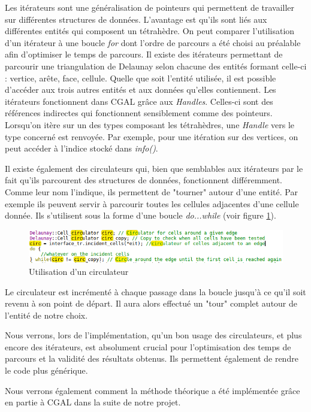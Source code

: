 Les itérateurs sont une généralisation de pointeurs qui permettent de travailler sur
différentes structures de données. L'avantage est qu'ils sont liés aux différentes entités
qui composent un tétrahèdre. On peut comparer l'utilisation d'un itérateur à une boucle
\textit{for} dont l'ordre de parcours a été choisi au préalable afin d'optimiser
le temps de parcours.
Il existe des itérateurs permettant de parcourir une triangulation de Delaunay
selon chacune des entités formant celle-ci : vertice, arête, face, cellule. Quelle
que soit l'entité utilisée, il est possible d'accéder aux trois autres entités et
aux données qu'elles contiennent. Les itérateurs fonctionnent dans CGAL grâce aux
\textit{Handles}. Celles-ci sont des références indirectes qui fonctionnent sensiblement
comme des pointeurs. Lorsqu'on itère sur un des types composant les tétrahèdres, une
\textit{Handle} vers le type concerné est renvoyée. Par exemple, pour une itération sur des
vertices, on peut accéder à l'indice stocké dans \textit{info()}.



Il existe également des circulateurs qui, bien que semblables aux itérateurs par le fait
qu'ils parcourent des structures de données, fonctionnent différemment. Comme leur nom
l'indique, ils permettent de "tourner" autour d'une entité. Par exemple ils peuvent
servir à parcourir toutes les cellules adjacentes d'une cellule donnée. Ils s'utilisent
sous la forme d'une boucle \textit{do...while} (voir figure \ref{fig::circ_ex}).
\begin{figure}[ht]
\centering
  \includegraphics[width=\textwidth]{figures/circ_ex.png}
  \caption{Utilisation d'un circulateur}
  \label{fig::circ_ex}
\end{figure}
 Le circulateur est incrémenté à chaque
passage dans la boucle jusqu'à ce qu'il soit revenu à son point de départ. Il aura alors
effectué un "tour" complet autour de l'entité de notre choix.


Nous verrons, lors de l'implémentation, qu'un bon usage des circulateurs, et plus encore des itérateurs,
est absolument crucial pour l'optimisation des temps de parcours et la validité
des résultats obtenus. Ils permettent également de rendre le code plus générique.

Nous verrons également comment la méthode théorique a été implémentée grâce en partie à CGAL
dans la suite de notre projet.
